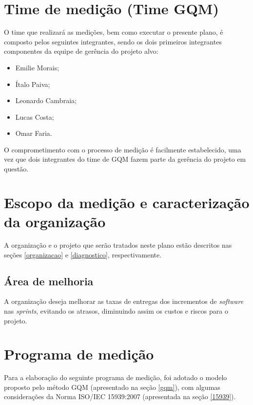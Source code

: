 \section{Time de medição (Time GQM)}
    
	O time que realizará as medições, bem como executar o presente plano, é composto pelos seguintes integrantes,
	sendo os dois primeiros integrantes componentes da equipe de gerência do projeto alvo:
	
	\begin{itemize}
	 \item Emilie Morais;
	 \item Ítalo Paiva;
	 \item Leonardo Cambraia;
	 \item Lucas Costa;
	 \item Omar Faria.
	\end{itemize}

	O comprometimento com o processo de medição é facilmente estabelecido, uma vez que dois integrantes do time de GQM 
	fazem parte da gerência do projeto em questão.
      
    \section{Escopo da medição e caracterização da organização}
    
      A organização e o projeto que serão tratados neste plano estão descritos nas seções 
      \ref{organizacao} e \ref{diagnostico}, respectivamente.
    
      \subsection{Área de melhoria}
      
	A organização deseja melhorar as taxas de entregas dos incrementos de \textit{software} nas \textit{sprints}, evitando os
	atrasos, diminuindo assim os custos e riscos para o projeto.
      
    
    \section{Programa de medição}
      
      Para a elaboração do seguinte programa de medição, foi adotado o modelo proposto pelo método GQM (apresentado na seção \ref{gqm}),
      com algumas considerações da Norma ISO/IEC 15939:2007 (apresentada na seção \ref{15939}).
      
